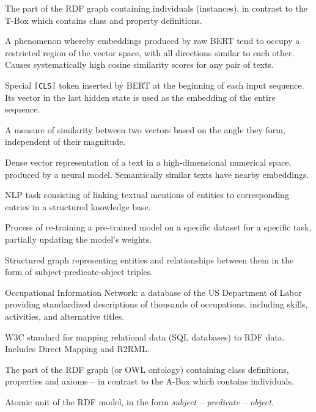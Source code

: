 \documentclass[12pt, a4paper]{report}
\begin{document}
\begin{description}[style=nextline]
  \item[A-Box (Assertional Box)]
    The part of the RDF graph containing individuals (instances), in
    contrast to the T-Box which contains class and property definitions.

  \item[Anisotropy]
    A phenomenon whereby embeddings produced by raw BERT tend to
    occupy a restricted region of the vector space, with all
    directions similar to each other. Causes systematically high cosine
    similarity scores for any pair of texts.

  \item[CLS token]
    Special \texttt{[CLS]} token inserted by BERT at the beginning of
    each input sequence. Its vector in the last hidden state is
    used as the embedding of the entire sequence.

  \item[Cosine Similarity]
    A measure of similarity between two vectors based on the angle
    they form, independent of their magnitude.

  \item[Embedding]
    Dense vector representation of a text in a high-dimensional
    numerical space, produced by a neural model. Semantically similar
    texts have nearby embeddings.

  \item[Entity Linking]
    NLP task consisting of linking textual mentions of
    entities to corresponding entries in a structured knowledge base.

  \item[Fine-tuning]
    Process of re-training a pre-trained model on a specific
    dataset for a specific task, partially updating
    the model's weights.

  \item[Knowledge Graph]
    Structured graph representing entities and relationships between
    them in the form of subject-predicate-object triples.

  \item[O*NET]
    Occupational Information Network: a database of the US Department
    of Labor providing standardized descriptions of
    thousands of occupations, including skills, activities, and
    alternative titles.

  \item[RDB2RDF]
    W3C standard for mapping relational data (SQL databases)
    to RDF data. Includes Direct Mapping and R2RML.

  \item[T-Box (Terminological Box)]
    The part of the RDF graph (or OWL ontology) containing
    class definitions, properties and axioms -- in contrast to
    the A-Box which contains individuals.

  \item[RDF Triple]
    Atomic unit of the RDF model, in the form
    \textit{subject -- predicate -- object}.
\end{description}
\end{document}
